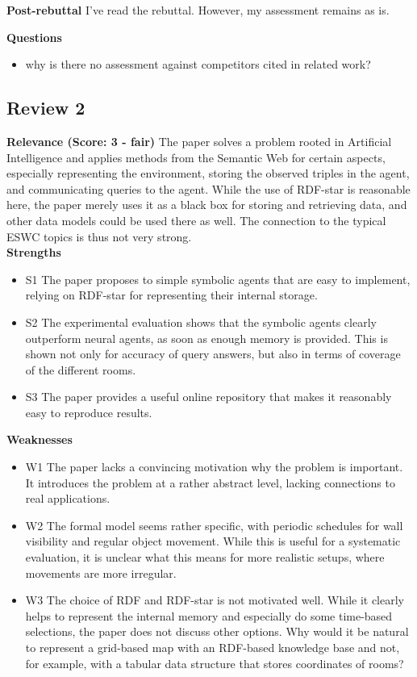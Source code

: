 \documentclass[runningheads]{llncs}
\begin{document}
\textbf{Post-rebuttal} \quad I've read the rebuttal. However, my assessment remains as is.

\textbf{Questions}
\begin{itemize}
  \item why is there no assessment against competitors cited in related work?
\end{itemize}

\subsection*{Review 2}
\textbf{Relevance (Score: 3 - fair)} \quad The paper solves a problem rooted in Artificial Intelligence and applies methods from the Semantic Web for certain aspects, especially representing the environment, storing the observed triples in the agent, and communicating queries to the agent. While the use of RDF-star is reasonable here, the paper merely uses it as a black box for storing and retrieving data, and other data models could be used there as well. The connection to the typical ESWC topics is thus not very strong.\\

\textbf{Strengths}
\begin{itemize}
  \item S1 The paper proposes to simple symbolic agents that are easy to implement, relying on RDF-star for representing their internal storage.
  \item S2 The experimental evaluation shows that the symbolic agents clearly outperform neural agents, as soon as enough memory is provided. This is shown not only for accuracy of query answers, but also in terms of coverage of the different rooms.
  \item S3 The paper provides a useful online repository that makes it reasonably easy to reproduce results.
\end{itemize}

\textbf{Weaknesses}
\begin{itemize}
  \item W1 The paper lacks a convincing motivation why the problem is important. It introduces the problem at a rather abstract level, lacking connections to real applications.
  \item W2 The formal model seems rather specific, with periodic schedules for wall visibility and regular object movement. While this is useful for a systematic evaluation, it is unclear what this means for more realistic setups, where movements are more irregular.
  \item W3 The choice of RDF and RDF-star is not motivated well. While it clearly helps to represent the internal memory and especially do some time-based selections, the paper does not discuss other options. Why would it be natural to represent a grid-based map with an RDF-based knowledge base and not, for example, with a tabular data structure that stores coordinates of rooms?
\end{itemize}
\end{document}

